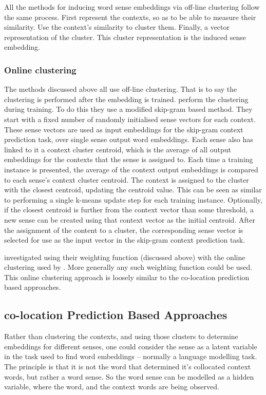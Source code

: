 \documentclass[12pt,parskip]{komatufte}
\begin{document}
All the methods for inducing word sense embeddings via off-line clustering follow the same process.
First represent the contexts,
so as to be able to measure their similarity.
Use the context's similarity to cluster them.
Finally, a vector representation of the cluster.
This cluster representation is the induced sense embedding.

\subsubsection{Online clustering}
The methods discussed above all use off-line clustering.
That is to say the clustering is performed after the embedding is trained.
 perform the clustering during training.
To do this they use a modified skip-gram based method.
They start with a fixed number of randomly initialised sense vectors for each context.
These sense vectors are used as input embeddings for the skip-gram context prediction task, over single sense output word embeddings.
Each sense also has linked to it a context cluster centroid, which is the average of all output embeddings for the contexts that the sense is assigned to.
Each time a training instance is presented, the average of the context output embeddings is compared to each sense's context cluster centroid.
The context is assigned to the cluster with the closest centroid, updating the centroid value.
This can be seen as similar to performing a single k-means update step for each training instance.
Optionally, if the closest centroid is further from the context vector than some threshold,  a new sense can be created using that context vector as the initial centroid.
After the assignment of the content to a cluster, the corresponding sense vector is selected for use as the input vector in the skip-gram context prediction task.

\textcite{kaageback2015neural} investigated using their weighting function (discussed above) with the online clustering used by \textcite{neelakantan2015efficient}.
More generally any such weighting function could be used.
This online clustering approach is loosely similar to the co-location prediction based approaches.


\subsection{co-location Prediction Based Approaches}
Rather than clustering the contexts, and using those clusters to determine embeddings for different senses, one could consider the sense as a latent variable in the task used to find word embeddings -- normally a language modelling task.
The principle is that it is not the word that determined it's collocated context words,
but rather a word sense.
So the word sense can be modelled as a hidden variable, where the word, and the context words are being observed.
\end{document}
